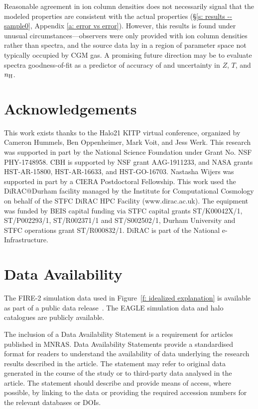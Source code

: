 \documentclass[fleqn,usenatbib]{mnras}
\begin{document}
Reasonable agreement in ion column densities does not necessarily signal that the modeled properties are consistent with the actual properties (\S\ref{s: results -- sample0}, Appendix \ref{a: error vs error}).
However, this results is found under unusual circumstances---observers were only provided with ion column densities rather than spectra, and the source data lay in a region of parameter space not typically occupied by CGM gas.
A promising future direction may be to evaluate spectra goodness-of-fit as a predictor of accuracy of and uncertainty in $Z$, $T$, and $n_{\rm H}$.

\section*{Acknowledgements}

This work exists thanks to the Halo21 KITP virtual conference, organized by Cameron Hummels, Ben Oppenheimer, Mark Voit, and Jess Werk.
This research was supported in part by the National Science Foundation under Grant No. NSF PHY-1748958. CBH is supported by NSF grant AAG-1911233, and NASA grants HST-AR-15800, HST-AR-16633, and HST-GO-16703.  Nastasha Wijers was supported in part by a CIERA Postdoctoral Fellowship.
This work used the DiRAC@Durham facility managed by the Institute for Computational
Cosmology on behalf of the STFC DiRAC HPC Facility (www.dirac.ac.uk). The equipment was funded by BEIS capital funding via STFC capital grants ST/K00042X/1, ST/P002293/1, ST/R002371/1 and ST/S002502/1, Durham University and STFC operations grant ST/R000832/1. DiRAC is part of the National e-Infrastructure.

\section*{Data Availability}

The FIRE-2 simulation data used in Figure~\ref{f: idealized explanation} is available as part of a public data release~\citep{wetzel2022Public}.
The EAGLE simulation data \citep{EagleTeam2017} and halo catalogues \citep{McAlpine2016} are publicly available. 

The inclusion of a Data Availability Statement is a requirement for articles published in MNRAS. Data Availability Statements provide a standardised format for readers to understand the availability of data underlying the research results described in the article. The statement may refer to original data generated in the course of the study or to third-party data analysed in the article. The statement should describe and provide means of access, where possible, by linking to the data or providing the required accession numbers for the relevant databases or DOIs.
\end{document}
